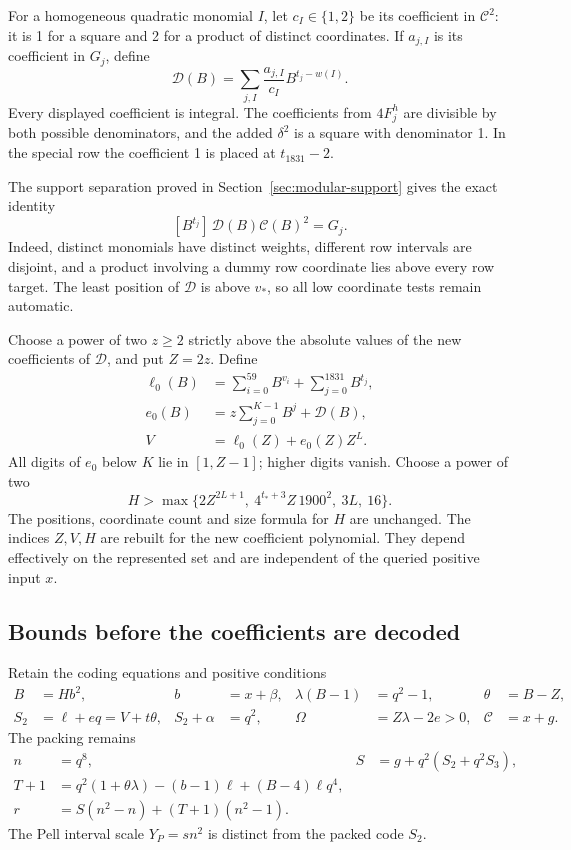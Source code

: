 For a homogeneous quadratic monomial $I$, let $c_I\in\{1,2\}$ be its
coefficient in $\mathcal C^2$: it is 1 for a square and 2 for a
product of distinct coordinates. If $a_{j,I}$ is its coefficient in
$G_j$, define
\[
 \mathcal D(B)=\sum_{j,I}\frac{a_{j,I}}{c_I}
                   B^{t_j-w(I)}.
\]
Every displayed coefficient is integral. The coefficients from
$4F_j^h$ are divisible by both possible denominators, and the added
$\delta^2$ is a square with denominator 1. In the special row the
coefficient 1 is placed at $t_{1831}-2$.

The support separation proved in Section~\ref{sec:modular-support}
gives the exact identity
\begin{equation}\label{eq:borrow-coefficient-identity}
 [B^{t_j}]\,\mathcal D(B)\mathcal C(B)^2=G_j.
\end{equation}
Indeed, distinct monomials have distinct weights, different row
intervals are disjoint, and a product involving a dummy row coordinate
lies above every row target. The least position of $\mathcal D$ is
above $v_*$, so all low coordinate tests remain automatic.

Choose a power of two $z\ge2$ strictly above the absolute values of
the new coefficients of $\mathcal D$, and put $Z=2z$. Define
\begin{align*}
 \ell_0(B)&=\sum_{i=0}^{59}B^{v_i}+\sum_{j=0}^{1831}B^{t_j},\\
 e_0(B)&=z\sum_{j=0}^{K-1}B^j+\mathcal D(B),\\
 V&=\ell_0(Z)+e_0(Z)Z^L.
\end{align*}
All digits of $e_0$ below $K$ lie in $[1,Z-1]$; higher digits vanish.
Choose a power of two
\begin{equation}\label{eq:borrow-index-bound}
 H>\max\{2Z^{2L+1},\ 4^{t_*+3}Z\,1900^2,\ 3L,\ 16\}.
\end{equation}
The positions, coordinate count and size formula for $H$ are unchanged.
The indices $Z,V,H$ are rebuilt for the new coefficient polynomial.
They depend effectively on the represented set and are independent of
the queried positive input $x$.

\subsection{Bounds before the coefficients are decoded}

Retain the coding equations and positive conditions
\begin{align*}
 B&=Hb^2,& b&=x+\beta,& \lambda(B-1)&=q^2-1,& \theta&=B-Z,\\
 S_2&=\ell+eq=V+t\theta,& S_2+\alpha&=q^2,&
 \Omega&=Z\lambda-2e>0,& \mathcal C&=x+g.
\end{align*}
The packing remains
\begin{align*}
 n&=q^8,& S&=g+q^2(S_2+q^2S_3),\\
 T+1&=q^2(1+\theta\lambda)-(b-1)\ell+(B-4)\ell q^4,\\
 r&=S(n^2-n)+(T+1)(n^2-1).
\end{align*}
The Pell interval scale $Y_P=sn^2$ is distinct from the packed code
$S_2$.

